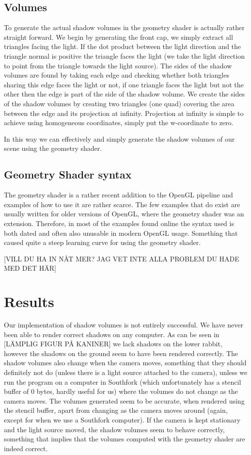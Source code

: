 \documentclass[a4paper, 12pt]{article}
\begin{document}
\subsection{Volumes}
To generate the actual shadow volumes in the geometry shader is actually rather straight forward. We begin by generating the front cap, we simply extract all triangles facing the light. If the dot product between the light direction and the triangle normal is positive the triangle faces the light (we take the light direction to point from the triangle towards the light source). The sides of the shadow volumes are found by taking each edge and checking whether both triangles sharing this edge faces the light or not, if one triangle faces the light but not the other then the edge is part of the side of the shadow volume. We create the sides of the shadow volumes by creating two triangles (one quad) covering the area between the edge and its projection at infinity. Projection at infinity is simple to achieve using homogeneous coordinates, simply put the w-coordinate to zero.

In this way we can effectively and simply generate the shadow volumes of our scene using the geometry shader.

\subsection{Geometry Shader syntax}
The geometry shader is a rather recent addition to the OpenGL pipeline and examples of how to use it are rather scarce. The few examples that do exist are usually written for older versions of OpenGL, where the geometry shader was an extension. Therefore, in most of the examples found online the syntax used is both dated and often also unusable in modern OpenGL usage. Something that caused quite a steep learning curve for using the geometry shader.

[VILL DU HA IN NÅT MER? JAG VET INTE ALLA PROBLEM DU HADE MED DET HÄR]

\section{Results}
Our implementation of shadow volumes is not entirely successful. We have never
been able to render correct shadows on any computer. As can be seen in [LÄMPLIG
FIGUR PÅ KANINER] we lack shadows on the lower rabbit, however the shadows on
the ground seem to have been rendered correctly. The shadow volumes also change
when the camera moves, something that they should definitely not do (unless
there is a light source attached to the camera), unless we run the program on
a computer in Southfork (which unfortunately has a stencil buffer of 0 bytes,
hardly useful for us) where the volumes do not change as the camera moves. The
volumes generated seem to be accurate, when rendered using the stencil buffer,
apart from changing as the camera moves around (again, except for when we use a
Southfork computer). If the camera is kept stationary and the light source
moved, the shadow volumes seem to behave correctly, something that implies that
the volumes computed with the geometry shader are indeed correct.
\end{document}
